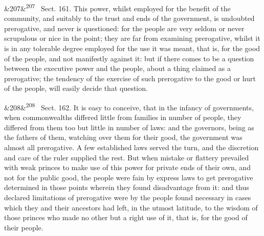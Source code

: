 \documentclass[12pt]{article}
\newcommand{\para}[1][]{\par\noindent\ifx&#1&\else\textsuperscript{\footnotesize #1}~\fi}
\begin{document}
\para[207] Sect. 161. This power, whilst employed for the benefit of the community, and suitably to the trust and ends of the government, is undoubted prerogative, and never is questioned: for the people are very seldom or never scrupulous or nice in the point; they are far from examining prerogative, whilst it is in any tolerable degree employed for the use it was meant, that is, for the good of the people, and not manifestly against it: but if there comes to be a question between the executive power and the people, about a thing claimed as a prerogative; the tendency of the exercise of such prerogative to the good or hurt of the people, will easily decide that question.

\para[208] Sect. 162. It is easy to conceive, that in the infancy of governments, when commonwealths differed little from families in number of people, they differed from them too but little in number of laws: and the governors, being as the fathers of them, watching over them for their good, the government was almost all prerogative. A few established laws served the turn, and the discretion and care of the ruler supplied the rest. But when mistake or flattery prevailed with weak princes to make use of this power for private ends of their own, and not for the public good, the people were fain by express laws to get prerogative determined in those points wherein they found disadvantage from it: and thus declared limitations of prerogative were by the people found necessary in cases which they and their ancestors had left, in the utmost latitude, to the wisdom of those princes who made no other but a right use of it, that is, for the good of their people.
\end{document}
